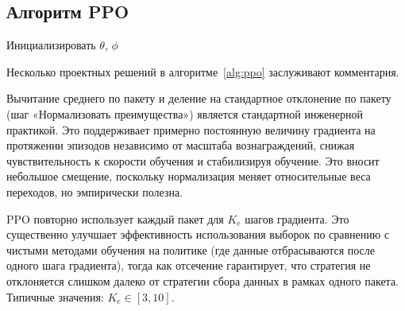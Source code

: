 \subsection{Алгоритм PPO}

\begin{algorithm}[ht]
\caption{Proximal Policy Optimization (PPO)}
\label{alg:ppo}
\DontPrintSemicolon
{}
Инициализировать $\theta$, $\phi$\;
\end{algorithm}

Несколько проектных решений в алгоритме~\ref{alg:ppo} заслуживают комментария.

\begin{remark}
Вычитание среднего по пакету и деление на стандартное отклонение по пакету (шаг «Нормализовать преимущества») является стандартной инженерной практикой. Это поддерживает примерно постоянную величину градиента на протяжении эпизодов независимо от масштаба вознаграждений, снижая чувствительность к скорости обучения и стабилизируя обучение. Это вносит небольшое смещение, поскольку нормализация меняет относительные веса переходов, но эмпирически полезна.
\end{remark}

\begin{remark}
PPO повторно использует каждый пакет для $K_e$ шагов градиента. Это существенно улучшает эффективность использования выборок по сравнению с чистыми методами обучения на политике (где данные отбрасываются после одного шага градиента), тогда как отсечение гарантирует, что стратегия не отклоняется слишком далеко от стратегии сбора данных в рамках одного пакета. Типичные значения: $K_e \in [3, 10]$.
\end{remark}

